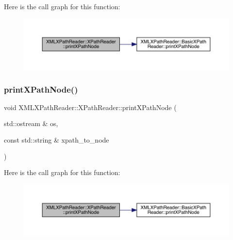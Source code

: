 Here is the call graph for this function\+:
\nopagebreak
\begin{figure}[H]
\begin{center}
\leavevmode
\includegraphics[width=350pt]{d3/d5a/classXMLXPathReader_1_1XPathReader_a8f751fb071319179252a48075239559c_cgraph}
\end{center}
\end{figure}
\mbox{\label{classXMLXPathReader_1_1XPathReader_a8f751fb071319179252a48075239559c}} 
\subsubsection{\texorpdfstring{printXPathNode()}{printXPathNode()}\hspace{0.1cm}{\footnotesize\ttfamily [2/2]}}
{\footnotesize\ttfamily void X\+M\+L\+X\+Path\+Reader\+::\+X\+Path\+Reader\+::print\+X\+Path\+Node (\begin{DoxyParamCaption}\item[{std\+::ostream \&}]{os,  }\item[{const std\+::string \&}]{xpath\+\_\+to\+\_\+node }\end{DoxyParamCaption})\hspace{0.3cm}{\ttfamily [inline]}}

Here is the call graph for this function\+:
\nopagebreak
\begin{figure}[H]
\begin{center}
\leavevmode
\includegraphics[width=350pt]{d3/d5a/classXMLXPathReader_1_1XPathReader_a8f751fb071319179252a48075239559c_cgraph}
\end{center}
\end{figure}
\mbox{\label{classXMLXPathReader_1_1XPathReader_a4df21ae718977be11eb5669002522ebb}} 
